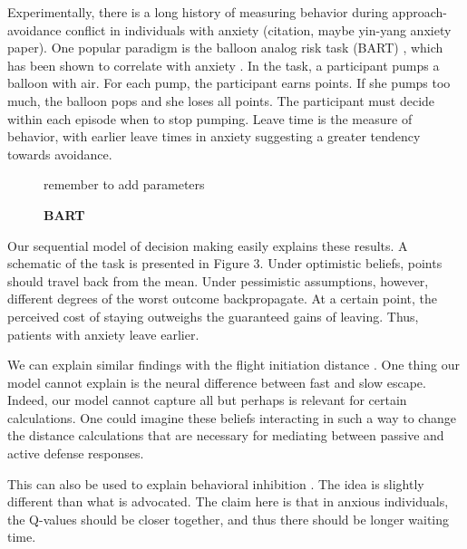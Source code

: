 \documentclass[11pt]{article} %
\begin{document}
Experimentally, there is a long history of measuring behavior during
approach-avoidance conflict in individuals with anxiety (citation, maybe yin-yang anxiety paper).
One popular paradigm is the balloon analog risk task (BART) \citep{Lejuez2002},
which has been shown to correlate with anxiety \cite{Maner2007, Giorgetta2012}.
In the task, a participant pumps a balloon with air. For each pump, the participant
earns points. If she pumps too much, the balloon pops and she loses all points.
The participant must decide within each episode when to stop pumping. Leave time
is the measure of behavior, with earlier leave times in anxiety suggesting a
greater tendency towards avoidance.

\begin{figure}
  \centerline{%
  }
  \caption{\textbf{BART}}
  \par remember to add parameters
\end{figure}

Our sequential model of decision making easily explains these results. A schematic
of the task is presented in Figure 3. Under optimistic beliefs, points should
travel back from the mean. Under pessimistic assumptions, however, different
degrees of the worst outcome backpropagate. At a certain point, the perceived cost
of staying outweighs the guaranteed gains of leaving. Thus, patients with anxiety
leave earlier.

We can explain similar findings with the flight initiation distance \citep{Mobbs2018,
Mobbs2019}. One thing our model cannot explain is the neural difference between
fast and slow escape. Indeed, our model cannot capture all but perhaps is relevant
for certain calculations. One could imagine these beliefs interacting in such a
way to change the distance calculations that are necessary for mediating between
passive and active defense responses.

This can also be used to explain behavioral inhibition \citep{bach2015, khemka2017}.
The idea is slightly different than what is advocated. The claim here is that
in anxious individuals, the Q-values should be closer together, and thus there
should be longer waiting time.
\end{document}
